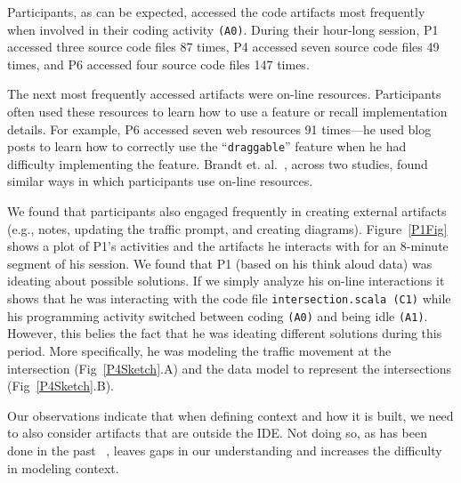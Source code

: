Participants, as can be expected, accessed the code artifacts most frequently when involved in their coding activity \texttt{(A0)}. During their hour-long session, P1 accessed three source code files 87 times, P4 accessed seven source code files 49 times, and P6 accessed four source code files 147 times. 

The next most frequently accessed artifacts were on-line resources. Participants often used these resources to learn how to use a feature or recall implementation details. For example, P6 accessed seven web resources 91 times---he used blog posts to learn how to correctly use the ``\texttt{draggable}'' feature when he had difficulty implementing the feature. Brandt et. al.~\cite{Brandt:2009}, across two studies, found similar ways in which participants use on-line resources.

We found that participants also engaged frequently in creating external artifacts (e.g., notes, updating the traffic prompt, and creating diagrams). Figure~\ref{P1Fig} shows a plot of P1's activities and the artifacts he interacts with for an 8-minute segment of his session. We found that P1 (based on his think aloud data) was ideating about possible solutions. If we simply analyze his on-line interactions it shows that he was interacting with the code file \texttt{intersection.scala (C1)} while his programming activity switched between coding \texttt{(A0)} and being idle \texttt{(A1)}. However, this belies the fact that he was ideating different solutions during this period. More specifically, he was modeling the traffic movement at the intersection (Fig~\ref{P4Sketch}.A) and the data model to represent the  intersections (Fig~\ref{P4Sketch}.B).


Our observations indicate that when defining context and how it is built, we need to also consider artifacts that are outside the IDE. Not doing so, as has been done in the past ~\cite{Gasparic:2017,Kersten:2006}, leaves gaps in our understanding and increases the difficulty in modeling context.


